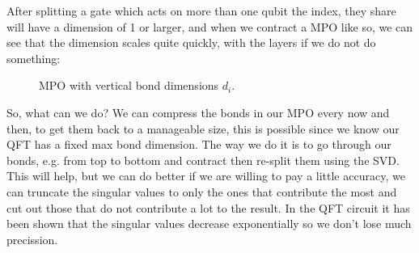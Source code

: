 \noindent
After splitting a gate which acts on more than one qubit the index, they share will have a dimension of 1 or larger, and when we contract a MPO like so, we can see that the dimension scales quite quickly, with the layers if we do not do something: 
\begin{figure}[H]
    \centering 

    \caption{MPO with vertical bond dimensions $d_{i}.$}
    \label{fig:mpo_contraction}
\end{figure}
\noindent 
So, what can we do? We can compress the bonds in our MPO every now and then, to get them back to a manageable size, this is possible since we know our QFT has a fixed max bond dimension. The way we do it is to go through our bonds, e.g. from top to bottom and contract then re-split them using the SVD. This will help, but we can do better if we are willing to pay a little accuracy, we can truncate the singular values to only the ones that contribute the most and cut out those that do not contribute a lot to the result. In the QFT circuit it has been shown that the singular values decrease exponentially so we don't lose much precission.    

